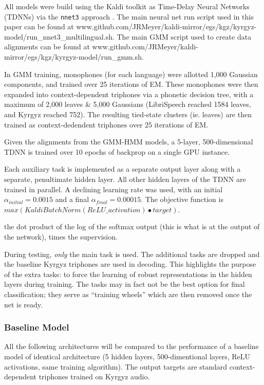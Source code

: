 \documentclass[a4paper]{article}
\begin{document}
All models were build using the Kaldi toolkit as Time-Delay Neural Networks (TDNNs) via the \texttt{nnet3} approach \cite{povey2011,peddinti2015}. The main neural net run script used in this paper can be found at www.github.com/JRMeyer/kaldi-mirror/egs/kgz/kyrgyz-model/run\_nnet3\_multilingual.sh. The main GMM script used to create data alignments can be found at www.github.com/JRMeyer/kaldi-mirror/egs/kgz/kyrgyz-model/run\_gmm.sh.

In GMM training, monophones (for each language) were allotted 1,000 Gaussian components, and trained over 25 iterations of EM. These monophones were then expanded into context-dependent triphones via a phonetic decision tree, with a maximum of 2,000 leaves \& 5,000 Gaussians (LibriSpeech reached 1584 leaves, and Kyrgyz reached 752). The resulting tied-state clusters (ie. leaves) are then trained as context-dedendent triphones over 25 iterations of EM.

Given the alignments from the GMM-HMM models, a 5-layer, 500-dimensional TDNN is trained over 10 epochs of backprop on a single GPU instance.

Each auxiliary task is implemented as a separate output layer along with a separate, penultimate hidden layer. All other hidden layers of the TDNN are trained in parallel. A declining learning rate was used, with an initial $\alpha_{initial}=0.0015$ and a final $\alpha_{final}=0.00015$. The objective function is $max( KaldiBatchNorm(ReLU\_activation) \bullet target )$.


the dot product of the log of the softmax output (this is what is at the output of the network), times the supervision.


During testing, \textit{only} the main task is used. The additional tasks are dropped and the baseline Kyrgyz triphones are used in decoding. This highlights the purpose of the extra tasks: to force the learning of robust representations in the hidden layers during training. The tasks may in fact not be the best option for final classification; they serve as ``training wheels'' which are then removed once the net is ready.



\subsubsection{Baseline Model}

All the following architectures will be compared to the performance of a baseline model of identical architecture (5 hidden layers, 500-dimentional layers, ReLU activations, same training algorithm). The output targets are standard context-dependent triphones trained on Kyrgyz audio.
\end{document}
